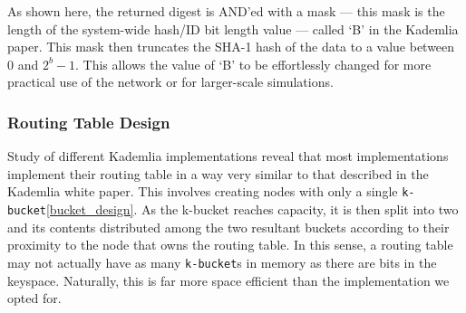 \documentclass[12pt]{report}
\newcommand{\code}[1]{\colorbox{codegray}{\texttt{#1}}}
\begin{document}
            As shown here, the returned digest is AND'ed with a mask --- this
            mask is the length of the system-wide hash/ID bit length value ---
            called `B' in the Kademlia paper.  This mask then truncates the
            SHA-1 hash of the data to a value between 0 and $2^b-1$.  This
            allows the value of `B' to be effortlessly changed for more
            practical use of the network or for larger-scale simulations.

            \subsubsection{Routing Table Design\label{routing_table_design}}
                Study of different Kademlia
                implementations\cite{implementation_01}\cite{implementation_02}\cite{implementation_03}\cite{implementation_04}
                reveal that most implementations implement their routing table
                in a way very similar to that described in the Kademlia white
                paper\cite{kademlia}.  This involves creating nodes with only a
                single \code{k-bucket}\ref{bucket_design}.  As the k-bucket
                reaches capacity, it is then split into two and its contents
                distributed among the two resultant buckets according to their
                proximity to the node that owns the routing table.  In this
                sense, a routing table may not actually have as many
                \code{k-bucket}s
                in memory as there are bits in the keyspace.  Naturally, this
                is far more space efficient than the implementation we opted
                for.
\end{document}
